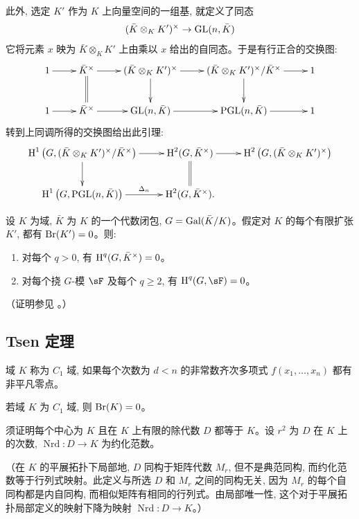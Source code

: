 此外, 选定 $K'$ 作为 $K$ 上向量空间的一组基, 就定义了同态
\[
  (\bar K\otimes_K K')^\times \to \operatorname{GL}(n,\bar K)
\]
它将元素 $x$ 映为 $\bar K\otimes_KK'$ 上由乘以 $x$ 给出的自同态。于是有行正合的交换图:
\[\xymatrix{
  1 \ar[r]
    & \bar K^\times \ar[r] \ar@{=}[d]
    & (\bar K\otimes_K K')^\times \ar[r] \ar[d]
    & (\bar K\otimes_K K')^\times / \bar K^\times \ar[r] \ar[d]
    & 1 \\
  1 \ar[r]
    & \bar K^\times \ar[r]
    & \gl(n,\bar K) \ar[r]
    & \pgl(n,\bar K) \ar[r]
    & 1
}\]
转到上同调所得的交换图给出此引理:
\[\xymatrix{
  \h^1\left(G,(\bar K\otimes_K K')^\times/\bar K^\times\right) \ar[r] \ar[d]
    & \h^2(G,\bar K^\times) \ar[r] \ar@{=}[d]
    & \h^2\left(G,(\bar K\otimes_K K')^\times\right) \\
  \h^1\left(G,\pgl(n,\bar K)\right) \ar[r]^-{\Delta_n}
    & \h^2(G,\bar K^\times) \text{.}
}\]

\begin{proposition}\label{I:3-1-6}
设 $K$ 为域, $\bar K$ 为 $K$ 的一个代数闭包, $G=\operatorname{Gal}(\bar K/K)$。假定对 $K$ 的每个有限扩张 $K'$, 都有 $\operatorname{Br}(K')=0$。则:
\begin{enumerate}[\indent i)]
  \item 对每个 $q>0$, 有 $\operatorname{H}^q(G,\bar K^\times)=0$。
  \item 对每个挠 $G$-模 $\sF$ 及每个 $q\geqslant2$, 有 $\h^q(G,\sF)=0$。
\end{enumerate}
\end{proposition}

（证明参见 \cite{se94}。）

\subsection{Tsen 定理}\label{I:3-2}

\begin{definition}\label{I:3-2-1}
域 $K$ 称为 $C_1$ 域, 如果每个次数为 $d<n$ 的非常数齐次多项式 $f(x_1,\dotsc,x_n)$ 都有非平凡零点。
\end{definition}

\begin{proposition}\label{I:3-2-2}
若域 $K$ 为 $C_1$ 域, 则 $\operatorname{Br}(K)=0$。
\end{proposition}

须证明每个中心为 $K$ 且在 $K$ 上有限的除代数 $D$ 都等于 $K$。设 $r^2$ 为 $D$ 在 $K$ 上的次数, $\operatorname{Nrd}:D\to K$ 为约化范数。

（在 $K$ 的平展拓扑下局部地, $D$ 同构于矩阵代数 $M_r$, 但不是典范同构, 而约化范数等于行列式映射。此定义与所选 $D$ 和 $M_r$ 之间的同构无关, 因为 $M_r$ 的每个自同构都是内自同构, 而相似矩阵有相同的行列式。由局部唯一性, 这个对于平展拓扑局部定义的映射下降为映射 $\operatorname{Nrd}:D\to K$。）

